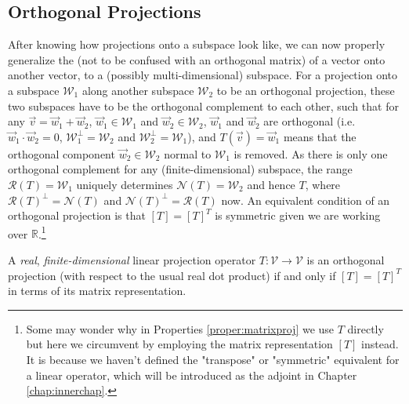 \subsection{Orthogonal Projections}
\label{subsection:orthoproj}

After knowing how projections onto a subspace look like, we can now properly generalize the  (not to be confused with an orthogonal matrix) of a vector onto another vector, to a (possibly multi-dimensional) subspace. For a projection onto a subspace $\mathcal{W}_1$ along another subspace $\mathcal{W}_2$ to be an orthogonal projection, these two subspaces have to be the orthogonal complement to each other, such that for any $\vec{v} = \vec{w}_1 + \vec{w}_2$, $\vec{w}_1 \in \mathcal{W}_1$ and $\vec{w}_2 \in \mathcal{W}_2$, $\vec{w}_1$ and $\vec{w}_2$ are orthogonal (i.e.\ $\vec{w}_1 \cdot \vec{w}_2 = 0$, $\mathcal{W}_1^\perp = \mathcal{W}_2$ and $\mathcal{W}_2^\perp = \mathcal{W}_1$), and $T(\vec{v}) = \vec{w}_1$ means that the orthogonal component $\vec{w}_2 \in \mathcal{W}_2$ normal to $\mathcal{W}_1$ is removed. As there is only one orthogonal complement for any (finite-dimensional) subspace, the range $\mathcal{R}(T) = \mathcal{W}_1$ uniquely determines $\mathcal{N}(T) = \mathcal{W}_2$ and hence $T$, where $\mathcal{R}(T)^\perp = \mathcal{N}(T)$ and $\mathcal{N}(T)^\perp = \mathcal{R}(T)$ now. An equivalent condition of an orthogonal projection is that $[T] = [T]^T$ is symmetric given we are working over $\mathbb{R}$.\footnote{Some may wonder why in Properties \ref{proper:matrixproj} we use $T$ directly but here we circumvent by employing the matrix representation $[T]$ instead. It is because we haven't defined the "transpose" or "symmetric" equivalent for a linear operator, which will be introduced as the adjoint in Chapter \ref{chap:innerchap}.}
\begin{proper}
\label{proper:orthogonalproj}
A \textit{real}, \textit{finite-dimensional} linear projection operator $T: \mathcal{V} \to \mathcal{V}$ is an orthogonal projection (with respect to the usual real dot product) if and only if $[T] = [T]^T$ in terms of its matrix representation.  
\end{proper}
